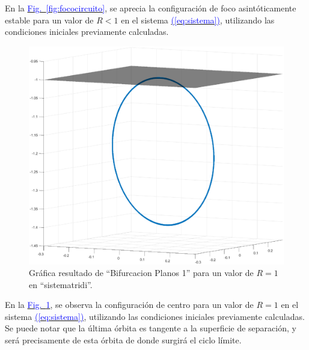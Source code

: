 \documentclass[12pt,a4paper]{report} %
\newcommand{\fref}[1]{\hyperref[#1]{\textcolor{blue}{Fig.~\ref*{#1}}}}
\newcommand{\eref}[1]{\hyperref[#1]{\textcolor{blue}{(\ref*{#1})}}}
\newcommand{\fref}[1]{\hyperref[#1]{\textcolor{blue}{\textit{Fig.~\ref*{#1}}}}}
\newcommand{\eref}[1]{\hyperref[#1]{\textcolor{blue}{\textit{(\ref*{#1})}}}}
\begin{document}
	\vspace{0.5cm}\noindent En la \fref{fig:fococircuito}, se aprecia la configuración de foco asintóticamente estable para un valor de $R<1$ en el sistema \eref{eq:sistema}, utilizando las condiciones iniciales previamente calculadas.
	
	\newpage
	
	\begin{figure}[h]
		\centering
		\includegraphics[width=1\textwidth]{centrocir.eps}
		\caption{Gráfica resultado de ``Bifurcacion Planos 1'' para un valor de $R=1$ en ``sistematridi''.}
		\label{fig:centrocircuito}
	\end{figure}\smallskip
	
		\vspace{0.5cm}\noindent En la \fref{fig:centrocircuito}, se observa la configuración de centro para un valor de $R=1$ en el sistema \eref{eq:sistema}, utilizando las condiciones iniciales previamente calculadas. Se puede notar que la última órbita es tangente a la superficie de separación, y será precisamente de esta órbita de donde surgirá el ciclo límite.
	
	\newpage
	
\end{document}
